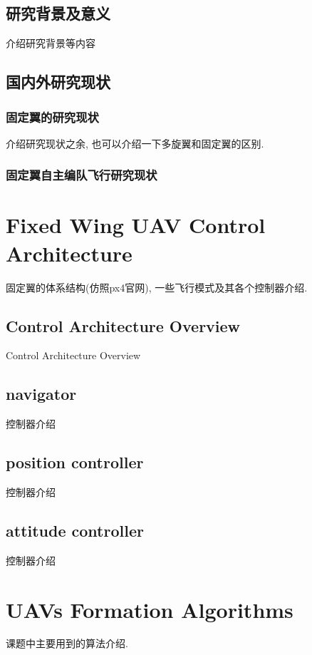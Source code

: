 \documentclass[UTF8,a4paper,10pt,nocolorlinks]{ctexart}
\begin{document}
        \subsection{研究背景及意义}
            介绍研究背景等内容
        \subsection{国内外研究现状}
            \subsubsection{固定翼的研究现状}
            介绍研究现状之余, 也可以介绍一下多旋翼和固定翼的区别. 
            \subsubsection{固定翼自主编队飞行研究现状}
    \clearpage
    \section{Fixed Wing UAV Control Architecture}
            固定翼的体系结构(仿照px4官网), 一些飞行模式及其各个控制器介绍. 
            \subsection{Control Architecture Overview}
            Control Architecture Overview
            \subsection{navigator}
                控制器介绍
            \subsection{position controller}
                控制器介绍
            \subsection{attitude controller}
                控制器介绍
    \clearpage
    \section{UAVs Formation Algorithms}
        课题中主要用到的算法介绍.
\end{document}
